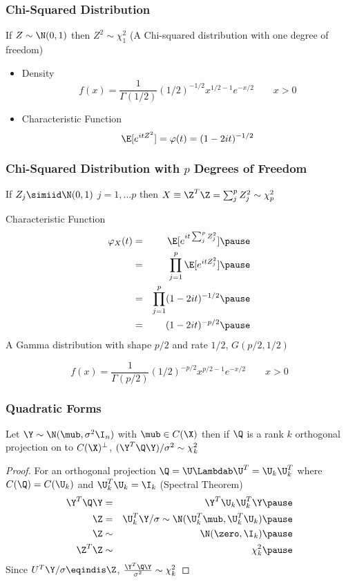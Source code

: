 \documentclass{beamer}
\begin{document}
\begin{frame}
  \frametitle{Chi-Squared Distribution}
  \begin{Definition}
    If $Z \sim \N(0,1)$ then $Z^2 \sim \chi^2_1$ (A Chi-squared
    distribution with one degree of freedom) \pause
    \begin{itemize}
    \item Density
$$
f(x) = \frac{1}{\Gamma(1/2)} (1/2)^{-1/2} x^{1/2 - 1} e^{-x/2} \qquad x
> 0
$$ \pause
  \item  Characteristic Function
$$
\E[e^{itZ^2}] = \varphi(t) = (1 - 2 i t)^{-1/2}
$$
  \end{itemize}

\end{Definition}
\end{frame}

\begin{frame}
  \frametitle{Chi-Squared Distribution with $p$ Degrees of Freedom}
If $Z_j \simiid \N(0,1)$ $j = 1, \ldots p$ then $X \equiv \Z^T\Z = \sum_j^p
Z_j^2 \sim \chi^2_p$  \pause

\begin{block}{Characteristic Function}
\begin{eqnarray*}
  \varphi_{X}(t) & = & \E[e^{it \sum_j^p
Z_j^2}] \pause \\
& = & \prod_{j=1}^p \E[e^{it Z_j^2 }] \pause \\
& = &  \prod_{j=1}^p (1 - 2 i t)^{-1/2} \pause \\
& = & (1 - 2 i t)^{-p/2} \pause
\end{eqnarray*}
A  Gamma distribution with shape $p/2$ and rate $1/2$, $G(p/2, 1/2)$ 

$$
f(x) = \frac{1}{\Gamma(p/2)} (1/2)^{-p/2} x^{p/2 - 1} e^{-x/2} \qquad x
> 0
$$
 \end{block}
\end{frame}
\begin{frame}
  \frametitle{Quadratic Forms}
  \begin{theorem}
  Let  $\Y \sim  \N(\mub, \sigma^2 \I_n)$ with $\mub \in C(\X)$ then if $\Q$ is
  a rank $k$ orthogonal  projection on to $C(\X)^{\perp}$,
$(\Y^T \Q \Y)/\sigma^2 \sim \chi^2_k$
  \end{theorem}
  \begin{proof}
    For an orthogonal projection  $\Q = \U \Lambdab \U^T 
    = \U_k \U_k^T$ where $C(\Q) = C(\U_k)$ and $\U_k^T\U_k = \I_k$
    (Spectral Theorem) \pause
    \begin{eqnarray*}
\Y^T\Q \Y  &=& \Y^T\U_k \U_k^T \Y      \pause \\
\Z & =  &\U_k^T \Y/ \sigma  \sim \N(\U_k^T\mub, \U_k^T\U_k) \pause \\
\Z & \sim & \N(\zero, \I_k) \pause \\
\Z^T\Z & \sim & \chi^2_k \pause 
    \end{eqnarray*}
Since $U^T\Y /\sigma \eqindis \Z$, $\frac{\Y^T\Q \Y}{\sigma^2} \sim
\chi^2_k$


  \end{proof}
\end{frame}
\end{document}

